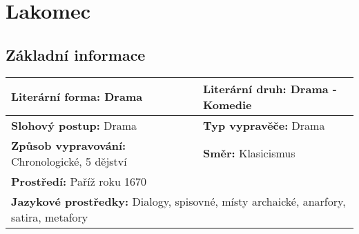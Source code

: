 \section{Lakomec}
\label{sec:lakomec}
\subsection*{Základní informace}
\begin{tabularx}{\linewidth}{l|l}
  \textbf{Literární forma:} Drama                       & \textbf{Literární druh:} Drama - Komedie                 \\
  \hline
  \textbf{Slohový postup:} Drama                        & \textbf{Typ vypravěče:} Drama                            \\
  \hline
  \textbf{Způsob vypravování:} Chronologické, 5 dějství & \textbf{Směr:} Klasicismus                               \\
  \hline
  \multicolumn{2}{l}{\textbf{Prostředí:} Paříž roku 1670}                                                          \\
  \hline
  \multicolumn{2}{l}{\textbf{Jazykové prostředky:} Dialogy, spisovné, místy archaické, anarfory, satira, metafory} \\
\end{tabularx}
